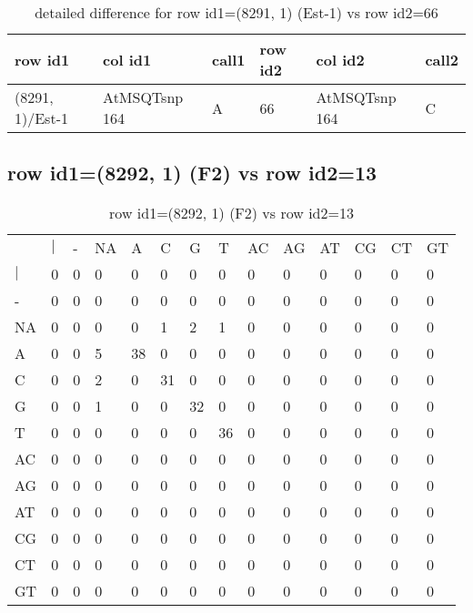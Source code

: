 \begin{center}
\begin{longtable}{|l|l|l|l|l|l|}
\caption{detailed difference for row id1=(8291, 1) (Est-1) vs row id2=66} \label{table_dm457}\\
\hline
row id1&col id1&call1&row id2&col id2&call2\\
\hline
(8291, 1)/Est-1&AtMSQTsnp 164&A&66&AtMSQTsnp 164&C\\
\hline
\end{longtable}
\end{center}

\subsection{row id1=(8292, 1) (F2) vs row id2=13}
\begin{center}
\begin{longtable}{|l|l|l|l|l|l|l|l|l|l|l|l|l|l|}
\caption{row id1=(8292, 1) (F2) vs row id2=13} \label{table_dm458}\\
\hline
\\
\hline
&$|$&-&NA&A&C&G&T&AC&AG&AT&CG&CT&GT\\
$|$&0&0&0&0&0&0&0&0&0&0&0&0&0\\
-&0&0&0&0&0&0&0&0&0&0&0&0&0\\
NA&0&0&0&0&1&2&1&0&0&0&0&0&0\\
A&0&0&5&38&0&0&0&0&0&0&0&0&0\\
C&0&0&2&0&31&0&0&0&0&0&0&0&0\\
G&0&0&1&0&0&32&0&0&0&0&0&0&0\\
T&0&0&0&0&0&0&36&0&0&0&0&0&0\\
AC&0&0&0&0&0&0&0&0&0&0&0&0&0\\
AG&0&0&0&0&0&0&0&0&0&0&0&0&0\\
AT&0&0&0&0&0&0&0&0&0&0&0&0&0\\
CG&0&0&0&0&0&0&0&0&0&0&0&0&0\\
CT&0&0&0&0&0&0&0&0&0&0&0&0&0\\
GT&0&0&0&0&0&0&0&0&0&0&0&0&0\\
\hline
\end{longtable}
\end{center}

